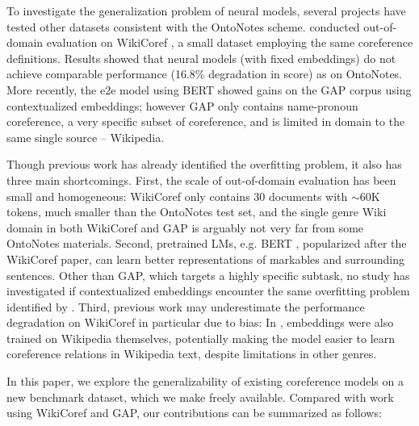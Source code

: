 \documentclass[11pt,a4paper]{article}
\begin{document}
To investigate the generalization problem of neural models, several projects have tested other datasets consistent with the OntoNotes scheme. \citet{moosavi-strube-2018-using} conducted out-of-domain evaluation on WikiCoref \cite{ghaddar-langlais-2016-wikicoref}, a small dataset employing the same coreference definitions. Results showed that neural models (with fixed embeddings) do not achieve comparable performance (16.8\% degradation in score) as on OntoNotes.
More recently, the e2e model using BERT \cite{Joshi2019BERTFC} showed gains on the GAP corpus \cite{webster2018gap} using contextualized embeddings; however GAP only contains name-pronoun coreference, a very specific subset of coreference, and is limited in domain to the same single source -- Wikipedia. 


Though previous work has already identified the overfitting problem, it also has three main shortcomings. First, the scale of out-of-domain evaluation has been small and homogeneous: WikiCoref only contains 30 documents with $\sim$60K tokens,  much smaller than the OntoNotes test set, and the single genre Wiki domain in both WikiCoref and GAP is arguably not very far from some OntoNotes materials. 
Second, pretrained LMs, e.g. BERT \cite{devlin2018bert}, popularized after the WikiCoref paper, can learn better representations of markables and surrounding sentences. Other than GAP, which targets a highly specific subtask, no study has investigated if contextualized embeddings encounter the same overfitting problem identified by \citeauthor{moosavi-strube-2017-lexical}. Third, previous work may underestimate the performance degradation on WikiCoref in particular due to bias: In \citet{moosavi-strube-2018-using}, embeddings were also trained on Wikipedia themselves, potentially making the model easier to learn coreference relations in Wikipedia text, despite limitations in other genres.




In this paper, we explore the generalizability of existing coreference models on a new benchmark dataset, which we make freely available. Compared with work using WikiCoref and GAP, our contributions can be summarized as follows:
\end{document}
